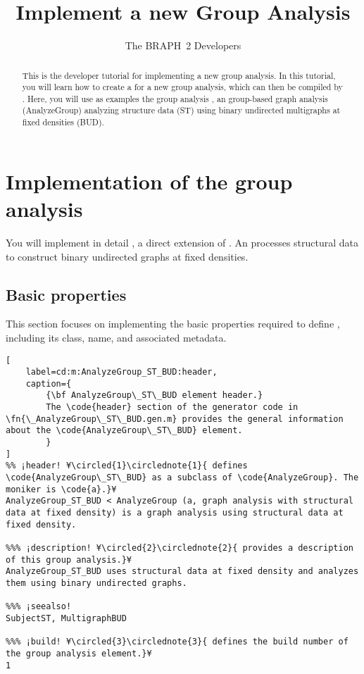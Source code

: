 \documentclass{tufte-handout}
\title{Implement a new Group Analysis}
\author[The BRAPH~2 Developers]{The BRAPH~2 Developers}
\begin{document}
\maketitle

\begin{abstract}
\noindent
This is the developer tutorial for implementing a new group analysis. 
In this tutorial, you will learn how to create a  for a new group analysis, which can then be compiled by .
Here, you will use as examples the group analysis , an group-based graph analysis (AnalyzeGroup) analyzing structure data (ST) using binary undirected multigraphs at fixed densities (BUD).
\end{abstract}

\tableofcontents

\clearpage

\section{Implementation of the group analysis}

You will implement in detail , a direct extension of .
An  processes structural data to construct binary undirected graphs at fixed densities.

\subsection{Basic properties}
This section focuses on implementing the basic properties required to define , including its class, name, and associated metadata.

\begin{lstlisting}[
	label=cd:m:AnalyzeGroup_ST_BUD:header,
	caption={
		{\bf AnalyzeGroup\_ST\_BUD element header.}
		The \code{header} section of the generator code in \fn{\_AnalyzeGroup\_ST\_BUD.gen.m} provides the general information about the \code{AnalyzeGroup\_ST\_BUD} element.
		}
]
%% ¡header! ¥\circled{1}\circlednote{1}{ defines \code{AnalyzeGroup\_ST\_BUD} as a subclass of \code{AnalyzeGroup}. The moniker is \code{a}.}¥
AnalyzeGroup_ST_BUD < AnalyzeGroup (a, graph analysis with structural data at fixed density) is a graph analysis using structural data at fixed density.

%%% ¡description! ¥\circled{2}\circlednote{2}{ provides a description of this group analysis.}¥
AnalyzeGroup_ST_BUD uses structural data at fixed density and analyzes them using binary undirected graphs.

%%% ¡seealso!
SubjectST, MultigraphBUD

%%% ¡build! ¥\circled{3}\circlednote{3}{ defines the build number of the group analysis element.}¥
1
\end{lstlisting}
\end{document}
